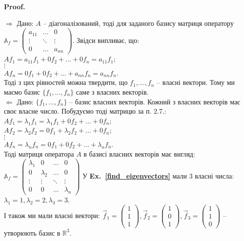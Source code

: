 \documentclass[a4paper, 10pt]{article}
\makeatletter
\def\rightproof{$\boxed{\Rightarrow}$ }
\def\leftproof{$\boxed{\Leftarrow}$ }
\theoremstyle{theoremdd}
\newcommand\exref[1]{\textbf{Ex.~\ref{#1}}}
\renewenvironment{proof}[1][Proof.\\]{\par
\pushQED{\hfill \qed}%
\normalfont \topsep6\p@\@plus6\p@\relax
\trivlist
\item\relax
{\bfseries
#1\@addpunct{.}}\hspace\labelsep\ignorespaces
}{%
\popQED\endtrivlist\@endpefalse
}
\makeatother
\begin{document}
\begin{proof}
\rightproof Дано: $A$ -- діагоналізований, тоді для заданого базису матриця оператору $\mathbb{A}_f = \begin{pmatrix}
a_{11} & \dots & 0 \\
\vdots & \ddots & \vdots \\
0 & \dots & a_{nn}
\end{pmatrix}$. Звідси випливає, що:\\
$Af_1 = a_{11}f_1 + 0f_2 + \dots + 0f_n = a_{11}f_1$;\\
$\vdots$\\
$Af_n = 0f_1 + 0f_2 + \dots + a_{nn}f_n = a_{nn}f_n$.\\
Тоді з цих рівностей можна твердити, що $f_1,\dots,f_n$ -- власні вектори. Тому ми маємо базис $\{f_1,\dots,f_n\}$ саме з власних векторів.
\bigskip \\
\leftproof Дано: $\{f_1,\dots,f_n\}$ -- базис власних векторів. Кожний з власних векторів має своє власне число. Побудуємо тоді матрицю за п. 2.7.:\\
$Af_1 = \lambda_1 f_1 = \lambda_1 f_1 + 0 f_2 + \dots + 0 f_n$;\\
$Af_2 = \lambda_2 f_2 = 0 f_1 + \lambda_2 f_2 + \dots + 0 f_n$;\\
$\vdots$\\
$Af_n = \lambda_n f_n = 0 f_1 + 0 f_2 + \dots + \lambda_n f_n$.\\
Тоді матриця оператора $A$ в базисі власних векторів має вигляд:\\
$\mathbb{A}_f = \begin{pmatrix}
\lambda_1 & 0 & \dots & 0 \\
0 & \lambda_2 & \dots & 0 \\
\vdots & \vdots & \ddots & \vdots \\
0 & 0 & \dots & \lambda_n
\end{pmatrix}$
\end{proof}
\noindent
У \exref{find_eigenvectors} мали 3 власні числа: $\lambda_1 = 1, \lambda_2 = 2,\lambda_3 = 3$.\\
І також ми мали власні вектори: $\vec{f}_1 = \begin{pmatrix}
1 \\ 1 \\ 1
\end{pmatrix}, \vec{f}_2 = \begin{pmatrix}
1 \\ 0 \\ 1
\end{pmatrix}, \vec{f}_3 = \begin{pmatrix}
1 \\ 1 \\ 0
\end{pmatrix}$ -- утворюють базис в $\mathbb{R}^3$.\\
\end{document}
